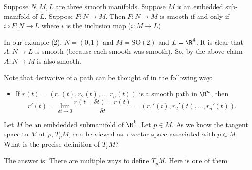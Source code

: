 \begin{theorem}
    Suppose \( N , M, L  \) are three smooth manifolds. Suppose \( M  \) is an embedded sub-manifold of \( L  \). Suppose \( F : N \to M  \). Then \( F: N \to M  \) is smooth if and only if \( i \circ F : N \to L  \) where \( i  \) is the inclusion map (\( i  : M \to L  \))  
\end{theorem}

In our example (2), \( N = (0,1) \) and \( M = \text{SO}(2) \) and \( L = \R^{4} \). It is clear that \( A : N \to L  \) is smooth (because each smooth was smooth). So, by the above claim \( A : N \to M  \) is also smooth.

Note that derivative of a path can be thought of in the following way:
\begin{itemize}
    \item If \( r(t) = ({r}_{1}(t), {r}_{2}(t), \dots, {r}_{n}(t)) \) is a smooth path in \( \R^{n} \), then 
        \[  r'(t) = \lim_{ \delta t  \to 0  }  \frac{ r(t + \delta t ) - r(t) }{ \delta t   } = ({r}_{1}'(t), {r}_{2}'(t), \dots, {r}_{n}'(t)). \]
        
        
\end{itemize} 

\begin{remark}
    Let \( M  \) be an embdedded submanifold of \( \R^{k} \). Let \( p \in M  \). As we know the tangent space to \( M  \) at \( p  \), \( {T}_{p}M \), can be viewed as a vector space associated with \( p \in M  \). What is the precise definition of \( {T}_{p}M \)?  
\end{remark}

The answer is: There are multiple ways to define \( {T}_{p}M \). Here is one of them

